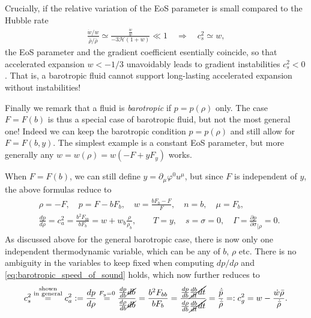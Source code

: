 Crucially, if the relative variation of the EoS parameter is small compared to the Hubble rate
\begin{align}
    \frac{\dot{w}/w}{\dot{\bar{\rho}}/\bar{\rho}}\simeq \frac{\tfrac{\dot{w}}{w}}{-3\mathcal{H}(1+w)}\ll 1 \quad \Rightarrow \quad c_s^2\simeq w,
\end{align}
the EoS parameter and the gradient coefficient esentially coincide, so that accelerated expansion $w<-1/3$ unavoidably leads to gradient instabilities $c_s^2<0$.
That is, a barotropic fluid cannot support long-lasting accelerated expansion without instabilities!

Finally we remark that a fluid is \emph{barotropic} if $p=p(\rho)$ only.
The case $F=F(b)$ is thus a special case of barotropic fluid, but not the most general one!
Indeed we can keep the barotropic condition $p=p(\rho)$ and still allow for  $F=F(b,y)$.
The simplest example is a constant EoS parameter, but more generally any $w=w(\rho)=w(-F+yF_y)$ works.

When $F=F(b)$, we can still define $y=\partial_\mu\varphi^0u^\mu$, but since $F$ is independent of $y$, the above formulas reduce to
{\small\begin{align}\label{eq:thermo_variables_barotropic}
\begin{aligned}
    &\rho=-F,\quad p=F-bF_b,\quad w=\frac{bF_b-F}{F},\quad n=b,\quad \mu=F_b,\\[3pt]
    & \frac{d p}{d \rho}=c_a^2=\frac{b^2F_{bb}}{bF_b}= w+w_b \frac{\rho}{\rho_b},\qquad T=y,\quad s=\sigma=0,\quad \Gamma=\frac{\partial p}{\partial \sigma}_{|\rho}=0.
\end{aligned}\end{align}}
As discussed above for the general barotropic case, there is now only one independent thermodynamic variable, which can be any of $b$, $\rho$ etc. 
There is no ambiguity in the variables to keep fixed when computing $dp/d\rho$ and \eqref{eq:barotropic_speed_of_sound} holds, which now further reduces to
\begin{align}
    c_s^2\overset{\substack{\text{shown}\\ \text{in general}}}{=}
c_a^2:=\frac{dp}{d\rho}\overset{F_y=0}{=}\frac{\tfrac{dp}{db}\cancel{db}}{\tfrac{d\rho}{db}\cancel{db}}= \frac{b^2F_{bb}}{bF_b}=\frac{\tfrac{dp}{db}\cancel{\tfrac{db}{dt}dt}}{\tfrac{d\rho}{db}\cancel{\tfrac{db}{dt}dt}}=
    \frac{\dot{\bar{p}}}{\dot{\bar{\rho}}}=:c_g^2= w-\frac{\dot{w}\bar{\rho}}{\dot{\bar{\rho}}}.
\end{align}



